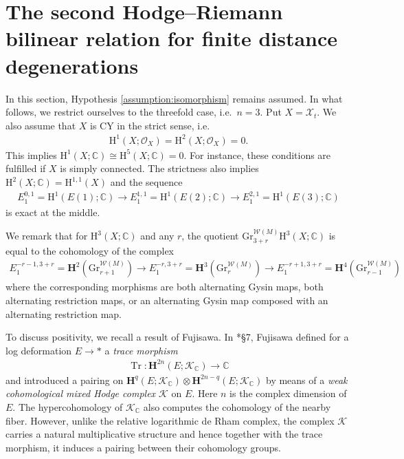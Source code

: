 \section{The second
Hodge--Riemann bilinear relation for finite distance degenerations}

In this section, Hypothesis \ref{assumption:isomorphism} remains assumed.
In what follows, we restrict ourselves to the threefold case, 
i.e.~\(n=3\).
Put \(X=\mathcal{X}_{t}\).
We also assume that \(X\) is CY in the strict sense, i.e.~
\begin{eqnarray*}
\mathrm{H}^{1}(X;\mathcal{O}_{X})
=\mathrm{H}^{2}(X;\mathcal{O}_{X})=0.
\end{eqnarray*} 
This implies 
\(\mathrm{H}^{1}(X;\mathbb{C})\cong \mathrm{H}^{5}(X;\mathbb{C})=0\).
For instance, these conditions are fulfilled if \(X\) is simply connected.
The strictness also implies 
\(\mathrm{H}^{2}(X;\mathbb{C})=\mathrm{H}^{1,1}(X)\) and
the sequence
\begin{eqnarray}
\label{eq:E11}
E^{0,1}_{1}=\mathrm{H}^{1}(E(1);\mathbb{C})\to
E^{1,1}_{1}=\mathrm{H}^{1}(E(2);\mathbb{C})\to 
E^{2,1}_{1}=\mathrm{H}^{1}(E(3);\mathbb{C})
\end{eqnarray}
is exact at the middle.

We remark that for \(\mathrm{H}^{3}(X;\mathbb{C})\)
and any \(r\), the quotient
\(\mathrm{Gr}_{3+r}^{\mathcal{W}(M)}\mathrm{H}^{3}(X;\mathbb{C})\)
is equal to the cohomology of the complex
\begin{eqnarray}
\label{eq:w-spectral-sq}
E^{-r-1,3+r}_{1}=\mathbf{H}^{2}(\mathrm{Gr}_{r+1}^{\mathcal{W}(M)})\to 
E^{-r,3+r}_{1}=\mathbf{H}^{3}(\mathrm{Gr}_{r}^{\mathcal{W}(M)})\to 
E^{-r+1,3+r}_{1}=\mathbf{H}^{4}(\mathrm{Gr}_{r-1}^{\mathcal{W}(M)})
\end{eqnarray}
where the corresponding morphisms are 
both alternating Gysin maps, both alternating restriction maps, or
an alternating Gysin map composed with an alternating restriction map.

To discuss positivity, we recall a result of
Fujisawa. In \cite{2014-Fujisawa-polarization-on-limiting-mixed-hodge-structures}*{\S7},
Fujisawa 
defined for a log deformation \(E\to\ast\) a \emph{trace morphism}
\begin{eqnarray*}
\operatorname{Tr}\colon \mathbf{H}^{2n}(E;\mathcal{K}_{\mathbb{C}})\to \mathbb{C}
\end{eqnarray*}
and introduced a pairing on \(\mathbf{H}^{q}(E;\mathcal{K}_{\mathbb{C}})\otimes
\mathbf{H}^{2n-q}(E;\mathcal{K}_{\mathbb{C}})\) by means of a 
\emph{weak cohomological mixed Hodge complex \(\mathcal{K}\)} on \(E\).
Here \(n\) is the complex dimension of \(E\).
The hypercohomology of \(\mathcal{K}_{\mathbb{C}}\) also computes the cohomology of 
the nearby fiber. However,
unlike the relative
logarithmic de Rham complex, 
the complex \(\mathcal{K}\) carries a natural 
multiplicative structure and hence together with the trace morphism, 
it induces a pairing between
their cohomology groups.


